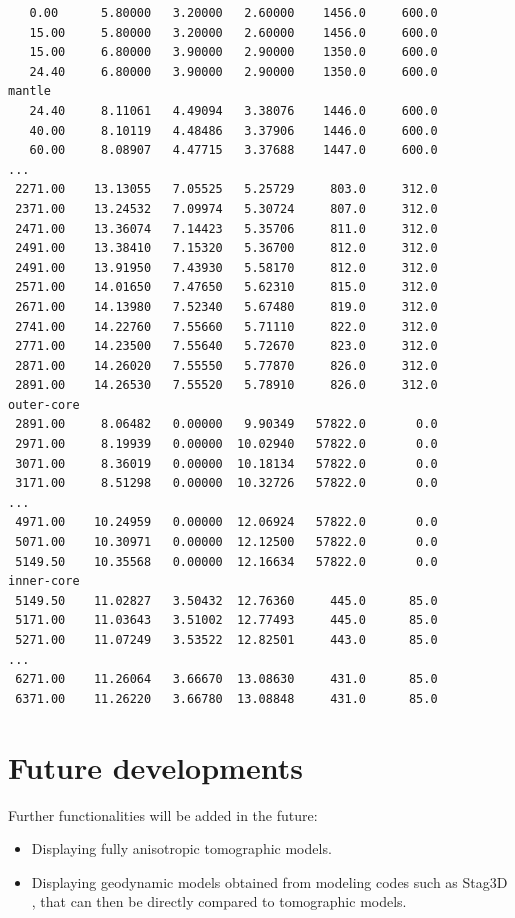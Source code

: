 \documentclass[12pt]{article}
\begin{document}
\begin{verbatim}
   0.00      5.80000   3.20000   2.60000    1456.0     600.0
   15.00     5.80000   3.20000   2.60000    1456.0     600.0
   15.00     6.80000   3.90000   2.90000    1350.0     600.0
   24.40     6.80000   3.90000   2.90000    1350.0     600.0
mantle
   24.40     8.11061   4.49094   3.38076    1446.0     600.0
   40.00     8.10119   4.48486   3.37906    1446.0     600.0
   60.00     8.08907   4.47715   3.37688    1447.0     600.0
...
 2271.00    13.13055   7.05525   5.25729     803.0     312.0
 2371.00    13.24532   7.09974   5.30724     807.0     312.0
 2471.00    13.36074   7.14423   5.35706     811.0     312.0
 2491.00    13.38410   7.15320   5.36700     812.0     312.0
 2491.00    13.91950   7.43930   5.58170     812.0     312.0
 2571.00    14.01650   7.47650   5.62310     815.0     312.0
 2671.00    14.13980   7.52340   5.67480     819.0     312.0
 2741.00    14.22760   7.55660   5.71110     822.0     312.0
 2771.00    14.23500   7.55640   5.72670     823.0     312.0
 2871.00    14.26020   7.55550   5.77870     826.0     312.0
 2891.00    14.26530   7.55520   5.78910     826.0     312.0
outer-core
 2891.00     8.06482   0.00000   9.90349   57822.0       0.0
 2971.00     8.19939   0.00000  10.02940   57822.0       0.0
 3071.00     8.36019   0.00000  10.18134   57822.0       0.0
 3171.00     8.51298   0.00000  10.32726   57822.0       0.0
...
 4971.00    10.24959   0.00000  12.06924   57822.0       0.0
 5071.00    10.30971   0.00000  12.12500   57822.0       0.0
 5149.50    10.35568   0.00000  12.16634   57822.0       0.0
inner-core
 5149.50    11.02827   3.50432  12.76360     445.0      85.0
 5171.00    11.03643   3.51002  12.77493     445.0      85.0
 5271.00    11.07249   3.53522  12.82501     443.0      85.0
...
 6271.00    11.26064   3.66670  13.08630     431.0      85.0
 6371.00    11.26220   3.66780  13.08848     431.0      85.0
\end{verbatim}


\section{Future developments }

Further functionalities will be added in the future:
%
\begin{itemize}
\item Displaying fully anisotropic tomographic models.
\item Displaying geodynamic models obtained from modeling codes such as Stag3D \citep{stag3D}, that can then be directly compared to tomographic models.
\end{itemize}
\end{document}
